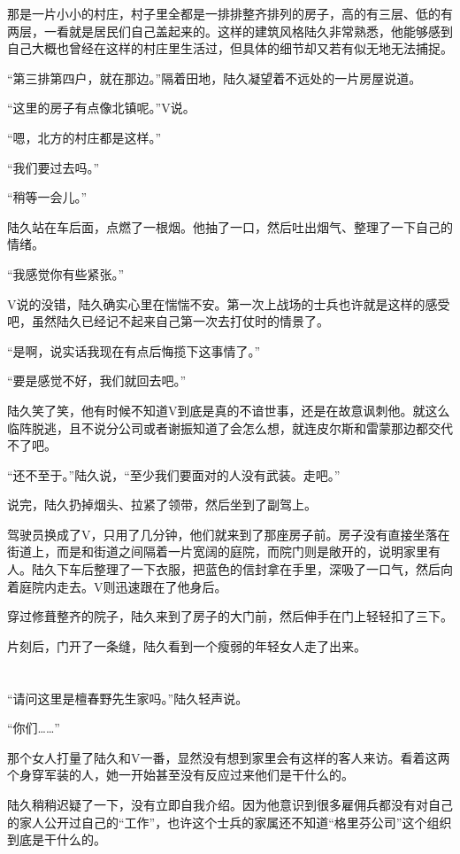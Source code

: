 那是一片小小的村庄，村子里全都是一排排整齐排列的房子，高的有三层、低的有两层，一看就是居民们自己盖起来的。这样的建筑风格陆久非常熟悉，他能够感到自己大概也曾经在这样的村庄里生活过，但具体的细节却又若有似无地无法捕捉。

“第三排第四户，就在那边。”隔着田地，陆久凝望着不远处的一片房屋说道。

“这里的房子有点像北镇呢。”V说。

“嗯，北方的村庄都是这样。”

“我们要过去吗。”

“稍等一会儿。”

陆久站在车后面，点燃了一根烟。他抽了一口，然后吐出烟气、整理了一下自己的情绪。

“我感觉你有些紧张。”

V说的没错，陆久确实心里在惴惴不安。第一次上战场的士兵也许就是这样的感受吧，虽然陆久已经记不起来自己第一次去打仗时的情景了。

“是啊，说实话我现在有点后悔揽下这事情了。”

“要是感觉不好，我们就回去吧。”

陆久笑了笑，他有时候不知道V到底是真的不谙世事，还是在故意讽刺他。就这么临阵脱逃，且不说分公司或者谢振知道了会怎么想，就连皮尔斯和雷蒙那边都交代不了吧。

“还不至于。”陆久说，“至少我们要面对的人没有武装。走吧。”

说完，陆久扔掉烟头、拉紧了领带，然后坐到了副驾上。

驾驶员换成了V，只用了几分钟，他们就来到了那座房子前。房子没有直接坐落在街道上，而是和街道之间隔着一片宽阔的庭院，而院门则是敞开的，说明家里有人。陆久下车后整理了一下衣服，把蓝色的信封拿在手里，深吸了一口气，然后向着庭院内走去。V则迅速跟在了他身后。

穿过修葺整齐的院子，陆久来到了房子的大门前，然后伸手在门上轻轻扣了三下。

片刻后，门开了一条缝，陆久看到一个瘦弱的年轻女人走了出来。

\section*{}

“请问这里是檀春野先生家吗。”陆久轻声说。

“你们……”

那个女人打量了陆久和V一番，显然没有想到家里会有这样的客人来访。看着这两个身穿军装的人，她一开始甚至没有反应过来他们是干什么的。

陆久稍稍迟疑了一下，没有立即自我介绍。因为他意识到很多雇佣兵都没有对自己的家人公开过自己的“工作”，也许这个士兵的家属还不知道“格里芬公司”这个组织到底是干什么的。

